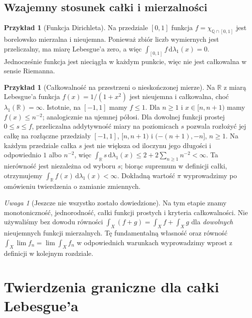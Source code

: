 \documentclass[11pt,a4paper,oneside]{book}
\numberwithin{equation}{chapter}
\theoremstyle{plain}
\theoremstyle{definition}
\newtheorem{przyklad}[twierdzenie]{Przykład}
\theoremstyle{remark}
\newtheorem{uwaga}[twierdzenie]{Uwaga}
\begin{document}
\section{Wzajemny stosunek całki i mierzalności}

\begin{przyklad}[Funkcja Dirichleta]
Na przedziale $[0,1]$ funkcja
$f=\chi_{\mathbb Q\cap[0,1]}$ jest borelowsko
mierzalna i nieujemna. Ponieważ zbiór liczb
wymiernych jest przeliczalny, ma miarę Lebesgue'a
zero, a więc $\int_{[0,1]} f\,\mathrm d\lambda_1(x)=0$.
Jednocześnie funkcja jest nieciągła w każdym punkcie,
więc nie jest całkowalna w sensie Riemanna.
\end{przyklad}

\begin{przyklad}[Całkowalność na przestrzeni o nieskończonej mierze]
Na $\mathbb R$ z miarą Lebesgue'a funkcja
$f(x)=1/(1+x^2)$ jest nieujemna i całkowalna, choć
$\lambda_1(\mathbb R)=\infty$. Istotnie, na $[-1,1]$
mamy $f\le1$. Dla $n\ge1$ i $x\in[n,n+1)$ mamy
$f(x)\le n^{-2}$; analogicznie na ujemnej półosi.
Dla dowolnej funkcji prostej $0\le s\le f$,
przeliczalna addytywność miary na poziomicach $s$
pozwala rozłożyć jej całkę na rozłączne przedziały
$[-1,1]$, $[n,n+1)$ i $(-(n+1),-n]$, $n\ge1$.
Na każdym przedziale całka $s$ jest nie większa
od iloczynu jego długości i odpowiednio $1$ albo
$n^{-2}$, więc
$\int_{\mathbb R}s\,\mathrm d\lambda_1(x)
\le2+2\sum_{n\ge1}n^{-2}<\infty$.
Ta nierówność jest niezależna od wyboru $s$;
biorąc supremum w definicji całki, otrzymujemy
$\int_{\mathbb R} f(x)\,\mathrm d\lambda_1(x)<\infty$. Dokładną wartość $\pi$ wyprowadzimy
po omówieniu twierdzenia o zamianie zmiennych.
\end{przyklad}

\begin{uwaga}[Jeszcze nie wszystko zostało dowiedzione]
Na tym etapie znamy monotoniczność, jednorodność,
całki funkcji prostych i kryteria całkowalności.
Nie używaliśmy bez dowodu równości
$\int_X(f+g)=\int_X f+\int_X g$ dla \emph{dowolnych}
nieujemnych funkcji mierzalnych. Tę fundamentalną
własność oraz równość $\int_X\lim f_n=\lim\int_X f_n$
w odpowiednich warunkach wyprowadzimy wprost
z definicji w kolejnym rozdziale.
\end{uwaga}



\chapter{Twierdzenia graniczne dla całki Lebesgue'a}
\label{ch:twierdzenia-graniczne}
\end{document}
